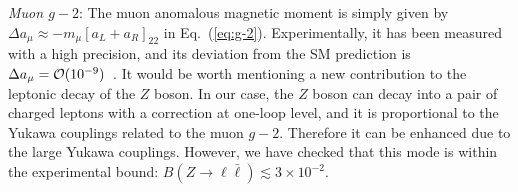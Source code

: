 \documentclass[%
showkeys,12pt,
preprint,preprintnumbers,nofootinbib,
groupedaddress,superscriptaddress,amsmath,amssymb]{revtex4}
\numberwithin{equation}{section}
\begin{document}
 {\it Muon $g-2$}:
The muon anomalous magnetic moment is simply given by
$\Delta a_\mu\approx -m_\mu[a_L+a_R]_{22}$ in  Eq.~(\ref{eq:g-2}).
%
Experimentally, it has been measured with 
a high precision, and its deviation from the SM prediction is 
$\Delta a_\mu={\cal O}(10^{-9})$~\cite{g-2}. 
{It would be worth mentioning a new contribution to the 
leptonic decay of the $Z$ boson. In our case, the $Z$ boson can decay 
into {a pair of charged leptons with a correction 
at one-loop level,}
and it is proportional to the Yukawa couplings related to the 
muon $g-2$. Therefore it can be enhanced due to the large Yukawa couplings.
However, we have checked that this mode is within the experimental 
bound: $B(Z\to \ell\bar\ell)\lesssim 3\times 10^{-2}$. 
}
\end{document}
